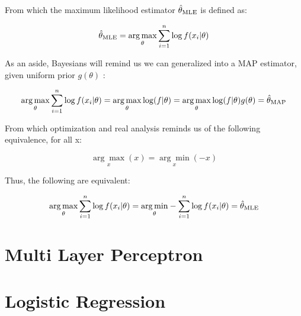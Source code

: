From which the maximum likelihood estimator $\hat{\theta}_{\textnormal{MLE}}$  is defined as:

   \begin{equation}
   \hat{\theta}_{\textnormal{MLE}} = \underset{\theta}{\arg\max} \sum\limits_{i=1}^n \log f(x_i|\theta) 
   \end{equation}

As an aside, Bayesians will remind us we can generalized into a MAP estimator, given uniform prior $ g(\theta) $ :

  \begin{equation}
   \underset{\theta}{\arg\max} \sum\limits_{i=1}^n \log f(x_i|\theta)  = \underset{\theta}{\arg\max} \log(f|\theta) = \underset{\theta}{\arg\max} \log(f|\theta) g(\theta) = \hat{\theta}_{\textnormal{MAP}} 
  \end{equation}

From which optimization and real analysis reminds us of the following equivalence, for all x:

   \begin{equation}
   \underset{x}{\arg\max} (x)  = \underset{x}{\arg\min} (-x) 
   \end{equation}

Thus, the following are equivalent:

   \begin{equation}
   \underset{\theta}{\arg\max} \sum\limits_{i=1}^n \log f(x_i|\theta) = \underset{\theta}{\arg\min} - \sum\limits_{i=1}^n \log f(x_i|\theta) = \hat{\theta}_{\textnormal{MLE}} 
   \end{equation}

\section{Multi Layer Perceptron}

\section{Logistic Regression}
